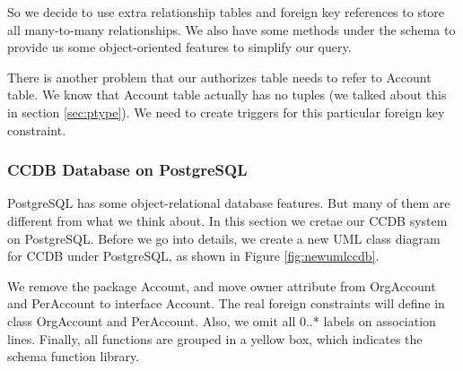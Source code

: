 \documentclass[11pt]{article}
\begin{document}
\par
So we decide to use extra relationship tables and foreign key references to store all many-to-many relationships. We also have some methods under the schema to provide us some object-oriented features to simplify our query.
\par
There is another problem that our authorizes table needs to refer to Account table. We know that Account table actually has no tuples (we talked about this in section \ref{sec:ptype}). We need to create triggers for this particular foreign key constraint.

\subsubsection{CCDB Database on PostgreSQL}
\par
PostgreSQL has some object-relational database features. But many of them are different from what we think about. In this section we cretae our CCDB system on PostgreSQL. Before we go into details, we create a new UML class diagram for CCDB under PostgreSQL, as shown in Figure \ref{fig:newumlccdb}.
\par
We remove the package Account, and move owner attribute from OrgAccount and PerAccount to interface Account. The real foreign constraints will define in class OrgAccount and PerAccount. Also, we omit all 0..* labels on association lines. Finally, all functions are grouped in a yellow box, which indicates the schema function library.
\end{document}
